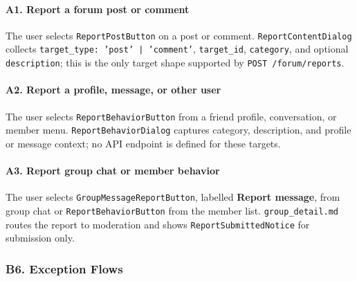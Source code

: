 \documentclass[12pt]{article}
\begin{document}
\hypertarget{sec:a1-report-a-forum-post-or-comment}{}
\paragraph*{A1. Report a forum post or comment}
\par\medskip

The user selects \texttt{ReportPostButton} on a post or comment. \texttt{ReportContentDialog} collects \texttt{target\_type: 'post' | 'comment'}, \texttt{target\_id}, \texttt{category}, and optional \texttt{description}; this is the only target shape supported by \texttt{POST /forum/reports}.
\par\medskip

\hypertarget{sec:a2-report-a-profile-message-or-other-user}{}
\paragraph*{A2. Report a profile, message, or other user}
\par\medskip

The user selects \texttt{ReportBehaviorButton} from a friend profile, conversation, or member menu. \texttt{ReportBehaviorDialog} captures category, description, and profile or message context; no API endpoint is defined for these targets.
\par\medskip

\hypertarget{sec:a3-report-group-chat-or-member-behavior}{}
\paragraph*{A3. Report group chat or member behavior}
\par\medskip

The user selects \texttt{GroupMessageReportButton}, labelled \textbf{Report message}, from group chat or \texttt{ReportBehaviorButton} from the member list. \texttt{group\_detail.md} routes the report to moderation and shows \texttt{ReportSubmittedNotice} for submission only.
\par\medskip

\hypertarget{sec:b6-exception-flows}{}
\subsubsection*{B6. Exception Flows}
\par\medskip

\hypertarget{sec:e1-invalid-category}{}
\end{document}
